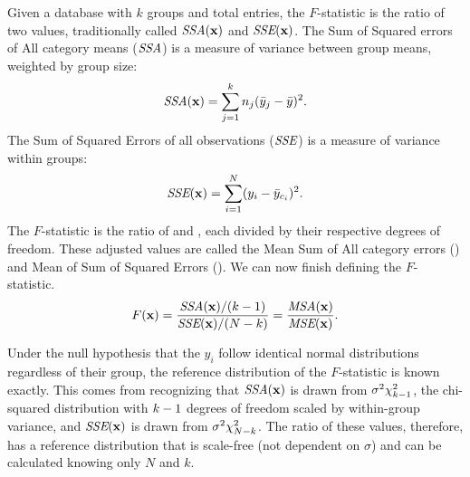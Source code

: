 \begin{definition}[$F$-Statistic] \label{def:fstat}
Given a database \x with $k$ groups and \dbsize total entries, the $F$-statistic is the ratio of two values, traditionally called $\textit{SSA}(\mathbf{x})$ and $\textit{SSE}(\mathbf{x})$.  The Sum of Squared errors of All category means ($\textit{SSA}$) is a measure of variance between group means, weighted by group size:
\begin{equation*}
\textit{SSA}(\mathbf{x}) = \sum_{j=1}^{k} n_j (\bar{y}_j - \bar{y})^2.
\end{equation*}
The Sum of Squared Errors of all observations ($\textit{SSE}$) is a measure of variance within groups:
\begin{equation*}
\textit{SSE}(\mathbf{x}) = \sum_{i=1}^{N}  (y_{i}-\bar{y}_{c_i})^2.
\end{equation*}
The $F$-statistic is the ratio of \ssa and \sse, each divided by their respective degrees of freedom.  These adjusted values are called  the Mean Sum of All category errors (\msa) and Mean of Sum of Squared Errors (\mse).
We can now finish defining the $F$-statistic.
\begin{equation*}
F(\mathbf{x})  = \frac{\textit{SSA}(\mathbf{x})/(k - 1)}{\textit{SSE}(\mathbf{x})/(N - k)} = \frac{\textit{MSA}(\mathbf{x})}{\textit{MSE}(\mathbf{x})}.
\end{equation*}
\end{definition}

Under the null hypothesis that the $y_i$ follow identical normal distributions regardless of their group, the reference distribution of the $F$-statistic is known exactly. This comes from recognizing that $\textit{SSA}(\mathbf{x})$ is drawn from $\sigma^2\chi_{k-1}^2$, the chi-squared distribution with $k-1$ degrees of freedom scaled by within-group variance, and $\textit{SSE}(\mathbf{x})$ is drawn from $\sigma^2 \chi^2_{N - k}$.  The ratio of these values, therefore, has a reference distribution that is scale-free (not dependent on $\sigma$) and can be calculated knowing only $N$ and $k$.

